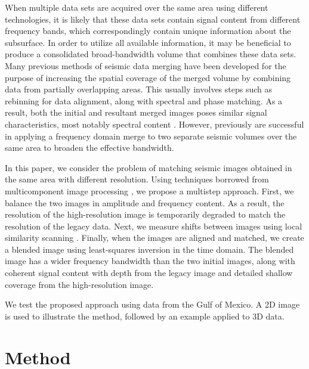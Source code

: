     When multiple data sets are acquired over the same area using different technologies, it is likely that these data sets contain signal content from different frequency bands, which correspondingly contain unique information about the subsurface. 
    In order to utilize all available information, it may be beneficial to produce a consolidated broad-bandwidth volume that combines these data sets.
    Many previous methods of seismic data merging have been developed for the purpose of increasing the spatial coverage of the merged volume by combining data from partially overlapping areas. 
    This usually involves steps such as rebinning for data alignment, along with spectral and phase matching.
    As a result, both the initial and resultant merged images poses similar signal characteristics, most notably spectral content \cite[]{kavery,gabor,supermerge}. 
    However, previously \cite{freqmerge} are successful in applying a frequency domain merge to two separate seismic volumes over the same area to broaden the effective bandwidth.
    
    In this paper, we consider the problem of matching seismic images obtained in the same area with different resolution. 
    Using techniques borrowed from multicomponent image processing \cite[]{warp}, we propose a multistep approach. 
    First, we balance the two images in amplitude and frequency content. 
    As a result, the resolution of the high-resolution image is temporarily degraded to match the resolution of the legacy data. 
    Next, we measure shifts between images using local similarity scanning \cite[]{attr,timelapse}.
    Finally, when the images are aligned and matched, we create a blended image using least-squares inversion in the time domain. 
    The blended image has a wider frequency bandwidth than the two initial images, along with coherent signal content with depth from the legacy image and detailed shallow coverage from the high-resolution image. 
    
    We test the proposed approach using data from the Gulf of Mexico. 
    A 2D image is used to illustrate the method, followed by an example applied to 3D data.


\section{Method}
    
